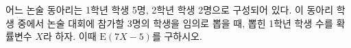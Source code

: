어느 논술 동아리는 1학년 학생 5명, 2학년 학생 2명으로 구성되어 있다. 이 동아리 학생 중에서 논술 대회에 참가할 3명의 학생을 임의로 뽑을 때, 뽑힌 1학년 학생 수를 확률변수 $X$라 하자. 이때 $\mathrm{E}(7X-5)$를 구하시오.
